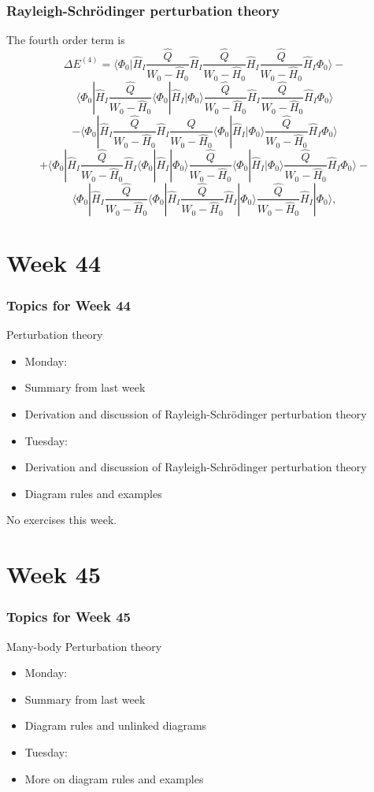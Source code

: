 \frame
{
\frametitle{Rayleigh-Schr\"odinger perturbation theory}
\begin{small}
{\scriptsize
The fourth order term is
\[
\Delta E^{(4)}=\langle \Phi_0|\hat{H}_I\frac{\hat{Q}}{W_0-\hat{H}_0}\hat{H}_I\frac{\hat{Q}}{W_0-\hat{H}_0}\hat{H}_I\frac{\hat{Q}}{W_0-\hat{H}_0}\hat{H}_I\Phi_0\rangle-\]
\[
\langle \Phi_0|\hat{H}_I\frac{\hat{Q}}{W_0-\hat{H}_0}\langle \Phi_0|\hat{H}_I|\Phi_0\rangle\frac{\hat{Q}}{W_0-\hat{H}_0}\hat{H}_I\frac{\hat{Q}}{W_0-\hat{H}_0}\hat{H}_I\Phi_0\rangle
\]
\[
-\langle \Phi_0|\hat{H}_I\frac{\hat{Q}}{W_0-\hat{H}_0}\hat{H}_I\frac{\hat{Q}}{W_0-\hat{H}_0}\langle \Phi_0|\hat{H}_I|\Phi_0\rangle\frac{\hat{Q}}{W_0-\hat{H}_0}\hat{H}_I\Phi_0\rangle\]
\[
+\langle \Phi_0|\hat{H}_I\frac{\hat{Q}}{W_0-\hat{H}_0}\hat{H}_I\langle \Phi_0|\hat{H}_I|\Phi_0\rangle\frac{\hat{Q}}{W_0-\hat{H}_0}\langle \Phi_0|\hat{H}_I|\Phi_0\rangle\frac{\hat{Q}}{W_0-\hat{H}_0}\hat{H}_I\Phi_0\rangle
-\]
\[
\langle\Phi_0|\hat{H}_I\frac{\hat{Q}}{W_0-\hat{H}_0}\langle\Phi_0|\hat{H}_I\frac{\hat{Q}}{W_0-\hat{H}_0}\hat{H}_I|\Phi_0\rangle  \frac{\hat{Q}}{W_0-\hat{H}_0}\hat{H}_I|\Phi_0\rangle,
\]
}
\end{small}
}




\section{Week  44}
\frame
{
  \frametitle{Topics for Week 44}
  \begin{block}{Perturbation theory}
\begin{itemize}
\item Monday:
\item Summary from last week
\item Derivation and discussion of Rayleigh-Schr\"odinger perturbation theory
\item Tuesday:
\item Derivation and discussion of Rayleigh-Schr\"odinger perturbation theory
\item Diagram rules and examples
\end{itemize}
No exercises this week.
  \end{block}
} 

\section{Week 45}

\frame
{
  \frametitle{Topics for Week 45}
  \begin{block}{Many-body Perturbation theory}
\begin{itemize}
\item Monday:
\item Summary from last week
\item Diagram rules and unlinked diagrams
\item Tuesday:
\item More on diagram rules and examples
\end{itemize}
  \end{block}
} 


